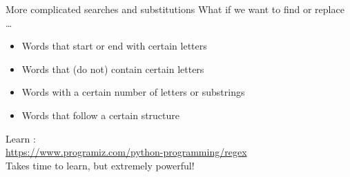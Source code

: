 \documentclass[aspectratio=169,usenames,dvipsnames]{beamer}
\begin{document}
%
%
%

\begin{frame}{More complicated searches and substitutions}
What if we want to find or replace \dots
\begin{itemize}
    \item Words that start or end with certain letters
    \item Words that (do not) contain certain letters
    \item Words with a certain number of letters or substrings
    \item Words that follow a certain structure
\end{itemize}

Learn :\\
\url{https://www.programiz.com/python-programming/regex} \\

\vspace{1em}
Takes time to learn, but extremely powerful!
\end{frame}
\end{document}
